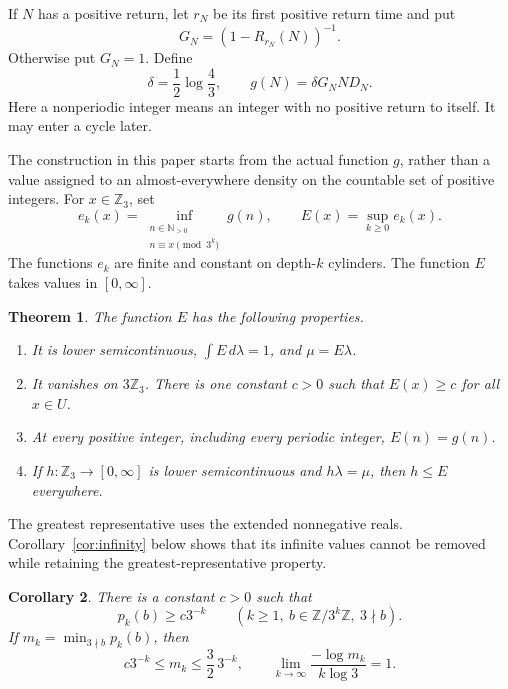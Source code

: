 \documentclass[11pt]{article}
\newtheorem{theorem}{Theorem}[section]
\newtheorem{corollary}[theorem]{Corollary}
\theoremstyle{remark}
\newcommand{\Zthree}{\mathbb Z_3}
\newcommand{\NN}{\mathbb N_{>0}}
\begin{document}
If \(N\) has a positive return, let \(r_N\) be its first positive
return time and put
\[
 G_N=(1-R_{r_N}(N))^{-1}.
\]
Otherwise put \(G_N=1\). Define
\begin{equation}\label{eq:g}
 \delta=\frac12\log\frac43,\qquad
 g(N)=\delta G_N N D_N.
\end{equation}
Here a nonperiodic integer means an integer with no positive return
to itself. It may enter a cycle later.

The construction in this paper starts from the actual function
\(g\), rather than a value assigned to an almost-everywhere density
on the countable set of positive integers. For \(x\in\Zthree\), set
\begin{equation}\label{eq:envelope}
 e_k(x)=\inf_{\substack{n\in\NN\\ n\equiv x\pmod{3^k}}}g(n),
 \qquad E(x)=\sup_{k\geq0}e_k(x).
\end{equation}
The functions \(e_k\) are finite and constant on depth-\(k\)
cylinders. The function \(E\) takes values in \([0,\infty]\).

\begin{theorem}\label{thm:envelope}
The function \(E\) has the following properties.
\begin{enumerate}
\item It is lower semicontinuous, \(\int E\,d\lambda=1\), and
\(\mu=E\lambda\).
\item It vanishes on \(3\Zthree\). There is one constant \(c>0\)
such that \(E(x)\geq c\) for all \(x\in U\).
\item At every positive integer, including every periodic integer,
\(E(n)=g(n)\).
\item If \(h:\Zthree\to[0,\infty]\) is lower semicontinuous and
\(h\lambda=\mu\), then \(h\leq E\) everywhere.
\end{enumerate}
\end{theorem}

The greatest representative uses the extended nonnegative reals.
Corollary~\ref{cor:infinity} below shows that its infinite values
cannot be removed while retaining the greatest-representative property.

\begin{corollary}\label{cor:cylinders}
There is a constant \(c>0\) such that
\[
 p_k(b)\geq c3^{-k}\qquad
 (k\geq1,\ b\in\mathbb Z/3^k\mathbb Z,\ 3\nmid b).
\]
If \(m_k=\min_{3\nmid b}p_k(b)\), then
\[
 c3^{-k}\leq m_k\leq\frac32\,3^{-k},\qquad
 \lim_{k\to\infty}\frac{-\log m_k}{k\log3}=1.
\]
\end{corollary}
\end{document}
